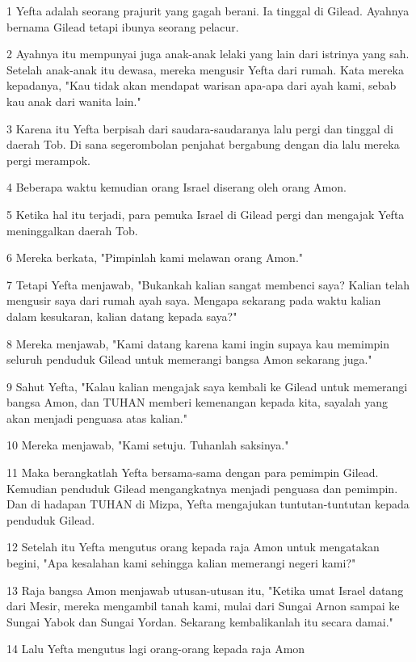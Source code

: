 \par 1 Yefta adalah seorang prajurit yang gagah berani. Ia tinggal di Gilead. Ayahnya bernama Gilead tetapi ibunya seorang pelacur.
\par 2 Ayahnya itu mempunyai juga anak-anak lelaki yang lain dari istrinya yang sah. Setelah anak-anak itu dewasa, mereka mengusir Yefta dari rumah. Kata mereka kepadanya, "Kau tidak akan mendapat warisan apa-apa dari ayah kami, sebab kau anak dari wanita lain."
\par 3 Karena itu Yefta berpisah dari saudara-saudaranya lalu pergi dan tinggal di daerah Tob. Di sana segerombolan penjahat bergabung dengan dia lalu mereka pergi merampok.
\par 4 Beberapa waktu kemudian orang Israel diserang oleh orang Amon.
\par 5 Ketika hal itu terjadi, para pemuka Israel di Gilead pergi dan mengajak Yefta meninggalkan daerah Tob.
\par 6 Mereka berkata, "Pimpinlah kami melawan orang Amon."
\par 7 Tetapi Yefta menjawab, "Bukankah kalian sangat membenci saya? Kalian telah mengusir saya dari rumah ayah saya. Mengapa sekarang pada waktu kalian dalam kesukaran, kalian datang kepada saya?"
\par 8 Mereka menjawab, "Kami datang karena kami ingin supaya kau memimpin seluruh penduduk Gilead untuk memerangi bangsa Amon sekarang juga."
\par 9 Sahut Yefta, "Kalau kalian mengajak saya kembali ke Gilead untuk memerangi bangsa Amon, dan TUHAN memberi kemenangan kepada kita, sayalah yang akan menjadi penguasa atas kalian."
\par 10 Mereka menjawab, "Kami setuju. Tuhanlah saksinya."
\par 11 Maka berangkatlah Yefta bersama-sama dengan para pemimpin Gilead. Kemudian penduduk Gilead mengangkatnya menjadi penguasa dan pemimpin. Dan di hadapan TUHAN di Mizpa, Yefta mengajukan tuntutan-tuntutan kepada penduduk Gilead.
\par 12 Setelah itu Yefta mengutus orang kepada raja Amon untuk mengatakan begini, "Apa kesalahan kami sehingga kalian memerangi negeri kami?"
\par 13 Raja bangsa Amon menjawab utusan-utusan itu, "Ketika umat Israel datang dari Mesir, mereka mengambil tanah kami, mulai dari Sungai Arnon sampai ke Sungai Yabok dan Sungai Yordan. Sekarang kembalikanlah itu secara damai."
\par 14 Lalu Yefta mengutus lagi orang-orang kepada raja Amon
